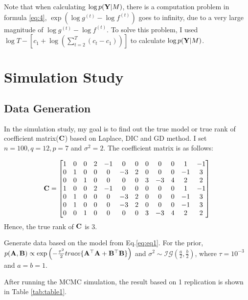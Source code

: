 \documentclass[]{book}
\begin{document}
Note that when calculating \(\log p({\bf Y}|M)\), there is a computation problem in formula \eqref{eq:4},
\(\exp (\log g^{(t)}-\log f^{(t)})\) goes to infinity, due to a very large magnitude of
\(\log g^{(t)}-\log f^{(t)}\). To solve this problem, I used
\(\log T - \left[c_1 + \log \left(\sum_{t=2}^{T} (c_t-c_{1})\right)\right]\) to calculate \(\log p({\bf Y}|M)\).

\hypertarget{simulation-study}{%
\section{Simulation Study}\label{simulation-study}}

\hypertarget{data-generation}{%
\subsection{Data Generation}\label{data-generation}}

In the simulation study, my goal is to find out the true model or true rank of coefficient matrix(\({\bf C}\)) based on Laplace, DIC and GD method. I set \(n=100,q=12,p=7\) and \(\sigma^2=2\). The coefficient matrix is as follows:

\[{\bf C}=\left[ \begin{array}{@{}*{12}{c}@{}}
1 & 0 & 0 & 2 & -1 & 0  & 0 & 0 & 0  & 0 & 1  & -1\\ 
0 & 1 & 0 & 0 & 0  & -3 & 2 & 0 & 0  & 0 & -1 & 3\\ 
0 & 0 & 1 & 0 & 0  & 0  & 0 & 3 & -3 & 4 & 2  & 2\\ 
1 & 0 & 0 & 2 & -1 & 0  & 0 & 0 & 0  & 0 & 1  & -1\\ 
0 & 1 & 0 & 0 & 0  & -3 & 2 & 0 & 0  & 0 & -1 & 3\\ 
0 & 1 & 0 & 0 & 0  & -3 & 2 & 0 & 0  & 0 & -1 & 3\\ 
0 & 0 & 1 & 0 & 0  & 0  & 0 & 3 &-3  &4  & 2  & 2
\end{array} \right]\]
Hence, the true rank of \({\bf C}\) is 3.

Generate data based on the model from Eq.\eqref{eq:eq1}. For the prior,
\(p({\bf A},{\bf B})\propto\exp\left(-\frac{\tau^2}{2} trace\{ {\bf A}^{{\top}}{\bf A}+{\bf B}^{{\top}}{\bf B}\}\right)\) and \(\sigma^2\sim \mathcal{IG}(\frac{a}{2},\frac{b}{2})\), where \(\tau=10^{-3}\) and \(a=b=1\).

After running the MCMC simulation, the result based on 1 replication is shown in Table \ref{tab:table1}.
\end{document}
